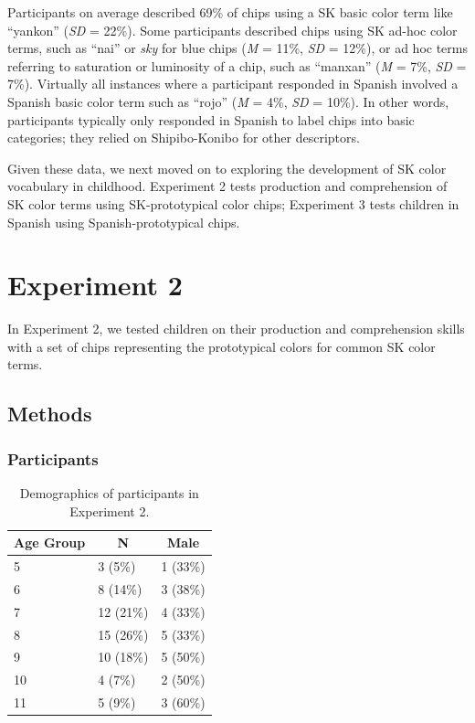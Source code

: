 \documentclass[floatsintext,man]{apa6}
\theoremstyle{definition}
\theoremstyle{definition}
\theoremstyle{definition}
\theoremstyle{remark}
\begin{document}
Participants on average described 69\% of chips using a SK basic color
term like \enquote{yankon} (\emph{SD} = 22\%). Some participants
described chips using SK ad-hoc color terms, such as \enquote{nai} or
\emph{sky} for blue chips (\emph{M} = 11\%, \emph{SD} = 12\%), or ad hoc
terms referring to saturation or luminosity of a chip, such as
\enquote{manxan} (\emph{M} = 7\%, \emph{SD} = 7\%). Virtually all
instances where a participant responded in Spanish involved a Spanish
basic color term such as \enquote{rojo} (\emph{M} = 4\%, \emph{SD} =
10\%). In other words, participants typically only responded in Spanish
to label chips into basic categories; they relied on Shipibo-Konibo for
other descriptors.

Given these data, we next moved on to exploring the development of SK
color vocabulary in childhood. Experiment 2 tests production and
comprehension of SK color terms using SK-prototypical color chips;
Experiment 3 tests children in Spanish using Spanish-prototypical chips.

\section{Experiment 2}\label{experiment-2}

In Experiment 2, we tested children on their production and
comprehension skills with a set of chips representing the prototypical
colors for common SK color terms.

\subsection{Methods}\label{methods-1}

\subsubsection{Participants}\label{participants-1}

\begin{table}[tbp]
\begin{center}
\begin{threeparttable}
\caption{\label{tab:unnamed-chunk-2}Demographics of participants in Experiment 2.}
\begin{tabular}{lll}
\toprule
Age Group & \multicolumn{1}{c}{N} & \multicolumn{1}{c}{Male}\\
\midrule
5 & 3 (5\%) & 1 (33\%)\\
6 & 8 (14\%) & 3 (38\%)\\
7 & 12 (21\%) & 4 (33\%)\\
8 & 15 (26\%) & 5 (33\%)\\
9 & 10 (18\%) & 5 (50\%)\\
10 & 4 (7\%) & 2 (50\%)\\
11 & 5 (9\%) & 3 (60\%)\\
\bottomrule
\end{tabular}
\end{threeparttable}
\end{center}
\end{table}
\end{document}

